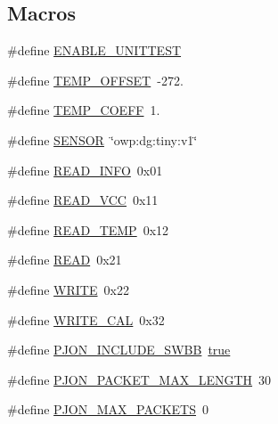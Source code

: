 \subsection*{Macros}
\begin{DoxyCompactItemize}
\item 
\#define \hyperlink{ATTINY_2Local_2SoftwareBitBang_2DeviceGeneric_2DeviceGeneric_8ino_a133432ca7ece04b33429e0fb94544867}{E\-N\-A\-B\-L\-E\-\_\-\-U\-N\-I\-T\-T\-E\-S\-T}
\item 
\#define \hyperlink{ATTINY_2Local_2SoftwareBitBang_2DeviceGeneric_2DeviceGeneric_8ino_a3cb24f09004f92185b77e9e7bac6ea61}{T\-E\-M\-P\-\_\-\-O\-F\-F\-S\-E\-T}~-\/272.
\item 
\#define \hyperlink{ATTINY_2Local_2SoftwareBitBang_2DeviceGeneric_2DeviceGeneric_8ino_ab667d793bed5c1fb5503624b0ab7504a}{T\-E\-M\-P\-\_\-\-C\-O\-E\-F\-F}~1.
\item 
\#define \hyperlink{ATTINY_2Local_2SoftwareBitBang_2DeviceGeneric_2DeviceGeneric_8ino_a84f1ead330bbcc83a63929c4726080d7}{S\-E\-N\-S\-O\-R}~\char`\"{}owp\-:dg\-:tiny\-:v1\char`\"{}
\item 
\#define \hyperlink{ATTINY_2Local_2SoftwareBitBang_2DeviceGeneric_2DeviceGeneric_8ino_ae9d85efda88bdfdba5ca9fe92f557dd9}{R\-E\-A\-D\-\_\-\-I\-N\-F\-O}~0x01
\item 
\#define \hyperlink{ATTINY_2Local_2SoftwareBitBang_2DeviceGeneric_2DeviceGeneric_8ino_a3563b296d5f60635a1256e8a12261d74}{R\-E\-A\-D\-\_\-\-V\-C\-C}~0x11
\item 
\#define \hyperlink{ATTINY_2Local_2SoftwareBitBang_2DeviceGeneric_2DeviceGeneric_8ino_ac8c23082885adeec4834469b64e00bb9}{R\-E\-A\-D\-\_\-\-T\-E\-M\-P}~0x12
\item 
\#define \hyperlink{ATTINY_2Local_2SoftwareBitBang_2DeviceGeneric_2DeviceGeneric_8ino_ada74e7db007a68e763f20c17f2985356}{R\-E\-A\-D}~0x21
\item 
\#define \hyperlink{ATTINY_2Local_2SoftwareBitBang_2DeviceGeneric_2DeviceGeneric_8ino_aa10f470e996d0f51210d24f442d25e1e}{W\-R\-I\-T\-E}~0x22
\item 
\#define \hyperlink{ATTINY_2Local_2SoftwareBitBang_2DeviceGeneric_2DeviceGeneric_8ino_a9418b096dba157494f523dc01b82a760}{W\-R\-I\-T\-E\-\_\-\-C\-A\-L}~0x32
\item 
\#define \hyperlink{ATTINY_2Local_2SoftwareBitBang_2DeviceGeneric_2DeviceGeneric_8ino_a41b4a27a2b3fe2878cdec063b22f5fc5}{P\-J\-O\-N\-\_\-\-I\-N\-C\-L\-U\-D\-E\-\_\-\-S\-W\-B\-B}~\hyperlink{stdbool_8h_a41f9c5fb8b08eb5dc3edce4dcb37fee7}{true}
\item 
\#define \hyperlink{ATTINY_2Local_2SoftwareBitBang_2DeviceGeneric_2DeviceGeneric_8ino_a58d21a16328181d94e377cb6dd32f680}{P\-J\-O\-N\-\_\-\-P\-A\-C\-K\-E\-T\-\_\-\-M\-A\-X\-\_\-\-L\-E\-N\-G\-T\-H}~30
\item 
\#define \hyperlink{ATTINY_2Local_2SoftwareBitBang_2DeviceGeneric_2DeviceGeneric_8ino_af093da5eac99580be6ba61b4dc79f2c1}{P\-J\-O\-N\-\_\-\-M\-A\-X\-\_\-\-P\-A\-C\-K\-E\-T\-S}~0
\end{DoxyCompactItemize}
